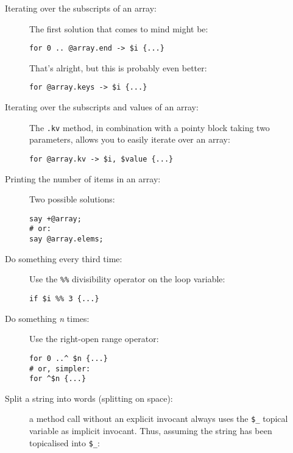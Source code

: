 \begin{description}
\item[Iterating over the subscripts of an array:] The first 
solution that comes to mind might be:

\begin{verbatim}
for 0 .. @array.end -> $i {...}
\end{verbatim}

That's alright, but this is probably even better:

\begin{verbatim}
for @array.keys -> $i {...}
\end{verbatim}

\item[Iterating over the subscripts and values of an array:] 
The \verb'.kv' method, in combination with a pointy block 
taking two parameters, allows you to easily iterate over an 
array:

\begin{verbatim}
for @array.kv -> $i, $value {...}
\end{verbatim}


\item[Printing the number of items in an array:] Two possible 
solutions:

\begin{verbatim}
say +@array; 
# or:
say @array.elems; 
\end{verbatim}

\item[Do something every third time:] Use the \verb'%%' 
divisibility operator on the loop variable:
\begin{verbatim}
if $i %% 3 {...}  
\end{verbatim}

\item[Do something \emph{n} times:] Use the right-open range operator:

\begin{verbatim}
for 0 ..^ $n {...}
# or, simpler:
for ^$n {...} 
\end{verbatim}

\item[Split a string into words (splitting on space):] 
a method call without an explicit invocant always uses 
the \verb'$_' topical variable as implicit invocant. Thus, 
assuming the string has been topicalised into \verb'$_':


\end{description}
